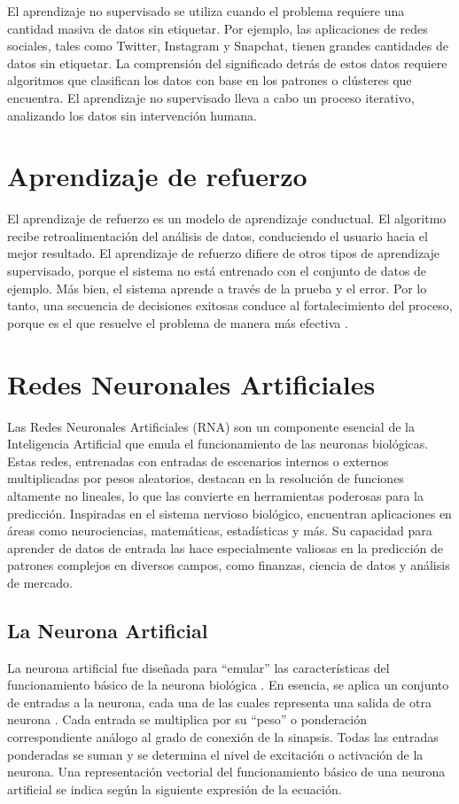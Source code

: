 El aprendizaje no supervisado se utiliza cuando el problema requiere una cantidad masiva de datos sin etiquetar. Por ejemplo, las aplicaciones de redes sociales, tales como Twitter, Instagram y Snapchat, tienen grandes cantidades de datos sin etiquetar. La comprensión del significado detrás de estos datos requiere algoritmos que clasifican los datos con base en los patrones o clústeres que encuentra. El aprendizaje no supervisado lleva a cabo un proceso iterativo, analizando los datos sin intervención humana\cite{ibm}.

\section{Aprendizaje de refuerzo}

El aprendizaje de refuerzo es un modelo de aprendizaje conductual. El algoritmo recibe retroalimentación del análisis de datos, conduciendo el usuario hacia el mejor resultado. El aprendizaje de refuerzo difiere de otros tipos de aprendizaje supervisado, porque el sistema no está entrenado con el conjunto de datos de ejemplo. Más bien, el sistema aprende a través de la prueba y el error. Por lo tanto, una secuencia de decisiones exitosas conduce al fortalecimiento del proceso, porque es el que resuelve el problema de manera más efectiva \cite{ibm}.

\section{Redes Neuronales Artificiales}
Las Redes Neuronales Artificiales (RNA) son un componente esencial de la Inteligencia Artificial que emula el funcionamiento de las neuronas biológicas. Estas redes, entrenadas con entradas de escenarios internos o externos multiplicadas por pesos aleatorios, destacan en la resolución de funciones altamente no lineales, lo que las convierte en herramientas poderosas para la predicción. Inspiradas en el sistema nervioso biológico, encuentran aplicaciones en áreas como neurociencias, matemáticas, estadísticas y más. Su capacidad para aprender de datos de entrada las hace especialmente valiosas en la predicción de patrones complejos en diversos campos, como finanzas, ciencia de datos y análisis de mercado.

\subsection{La Neurona Artificial}
La neurona artificial fue diseñada para “emular” las características del funcionamiento básico de la neurona biológica \cite{basogain2008redes}. En esencia, se aplica un conjunto de entradas a la neurona, cada una de las cuales representa una salida de otra neurona . Cada entrada se multiplica por su “peso” o ponderación correspondiente análogo al grado de conexión de la sinapsis. Todas las entradas ponderadas se suman y se determina el nivel de excitación o activación de la neurona. Una representación vectorial del funcionamiento
básico de una neurona artificial se indica según la siguiente expresión de la ecuación.


